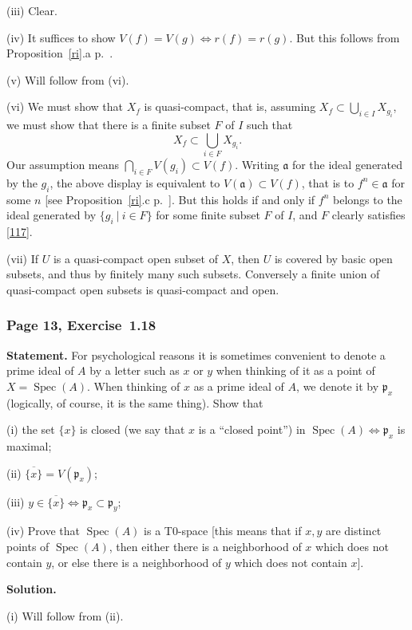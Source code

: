 \documentclass[12pt,letterpaper]{article}%
\newcommand{\mf}{\mathfrak}
\newcommand{\aaa}{\mf a}
\newcommand{\ppp}{\mf p}
\newcommand{\ov}{\overline}
\newcommand{\Spec}{\operatorname{Spec}}\newcommand{\Sp}{\operatorname{Spec}}
\newcommand{\nn}{\noindent}
\begin{document}
\nn(iii) Clear.

\nn(iv) It suffices to show $V(f)=V(g)\iff r(f)=r(g)$. But this follows from Proposition~\ref{ri}.a p.~\pageref{ri}.

\nn(v) Will follow from (vi).

\nn(vi) We must show that $X_f$ is quasi-compact, that is, assuming $X_f\subset \bigcup_{i\in I}X_{g_i}$, we must show that there is a finite subset $F$ of $I$ such that 
\begin{equation}\label{117}
X_f\subset\bigcup_{i\in F}X_{g_i}.
\end{equation}
Our assumption means $\bigcap_{i\in F}V(g_i)\subset V(f)$. Writing $\aaa$ for the ideal generated by the $g_i$, the above display is equivalent to $V(\aaa)\subset V(f)$, that is to $f^n\in\aaa$ for some $n$ [see Proposition~\ref{ri}.c p.~\pageref{ri}]. But this holds if and only if $f^n$ belongs to the ideal generated by $\{g_i\ |\ i\in F\}$ for some finite subset $F$ of $I$, and $F$ clearly satisfies \eqref{117}. 

\nn(vii) If $U$ is a quasi-compact open subset of $X$, then $U$ is covered by basic open subsets, and thus by finitely many such subsets. Conversely a finite union of quasi-compact open subsets is quasi-compact and open.

\subsubsection{Page 13, Exercise~1.18}%

\textbf{Statement.} For psychological reasons it is sometimes convenient to denote a prime ideal of $A$ by a letter such as $x$ or $y$ when thinking of it as a point of $X=\Spec(A)$. When thinking of $x$ as a prime ideal of $A$, we denote it by $\ppp_x$ (logically, of course, it is the same thing). Show that

\nn(i) the set $\{x\}$ is closed (we say that $x$ is a ``closed point'') in $\Spec(A)\iff\ppp_x$ is maximal;

\nn(ii) $\ov{\{x\}}=V(\ppp_x)$;

\nn(iii) $y\in\ov{\{x\}}\iff\ppp_x\subset\ppp_y$;

\nn(iv) Prove that $\Spec(A)$ is a T0-space [this means that if $x,y$ are distinct points of $\Spec(A)$, then either there is a neighborhood of $x$ which does not contain $y$, or else there is a neighborhood of $y$ which does not contain $x$].

\nn\textbf{Solution.} 

\nn(i) Will follow from (ii).
\end{document}
